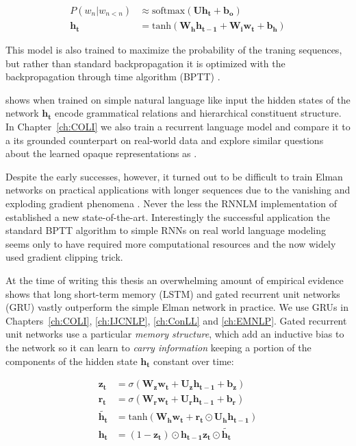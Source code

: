\begin{align}
P(w_n|w_{n<n}) &\approx \text{softmax}(\mathbf{U} \mathbf{h_t} + \mathbf{b_o}) \\
\mathbf{h_t} &= \text{tanh}(\mathbf{W_h}\mathbf{h_{t-1}} + \mathbf{W_i}\mathbf{w_t} + \mathbf{b_h})
\end{align}

This model is also trained to maximize the probability of the traning sequences, but rather than standard
backpropagation it is optimized with the backpropagation through time algorithm (BPTT)
\citep{robinson1987utility,werbos1988generalization,williams1995gradient}.

\cite{elman1991distributed} shows when trained on simple natural language like input the
hidden states of the network $\mathbf{h_t}$ encode grammatical relations and hierarchical
constituent structure. In Chapter~\ref{ch:COLI} we also train a recurrent language model
and compare it to a its grounded counterpart 
on real-world data and explore similar questions about the learned opaque representations 
as \cite{elman1991distributed} .

Despite the early successes, however, it turned out to be difficult to train
Elman networks on practical applications with longer sequences
due to the vanishing and exploding gradient phenomena \citep{bengio1994learning}.
Never the less the RNNLM implementation of \cite{mikolov2010recurrent}
established a new state-of-the-art. Interestingly the successful
application the standard BPTT algorithm
to simple RNNs on real world language modeling \cite{mikolov2012statistical}
seems  only to have required more computational resources and 
the now widely used gradient clipping trick.

At the time of writing this thesis an overwhelming amount of empirical evidence
shows that long short-term memory (LSTM) \citep{hochreiter1997long,gers1999learning}
and gated recurrent unit networks (GRU) \citep{cho2014learning}
vastly outperform the simple Elman network in practice. We use GRUs in
Chapters~\ref{ch:COLI}, \ref{ch:IJCNLP}, \ref{ch:ConLL} and \ref{ch:EMNLP}.
Gated recurrent unit networks use a particular \emph{memory structure}, which
add an inductive bias to the network so it can learn to \emph{carry information}
keeping a portion of the components of the hidden state $\mathbf{h_t}$
constant over time:

\begin{align}
\tag{update-gate}
\mathbf{z_t} &= \sigma(\mathbf{W_z} \mathbf{w_t} + \mathbf{U_z} \mathbf{h_{t-1}} + \mathbf{b_z}) \\
\tag{reset-gate}
\mathbf{r_t} &= \sigma(\mathbf{W_r} \mathbf{w_t} + \mathbf{U_r} \mathbf{h_{t-1}} + \mathbf{b_r})  \\
\tag{memory content}
\mathbf{\tilde{h_t}} &= \text{tanh}(\mathbf{W_h} \mathbf{w_t} + \mathbf{r_t} \odot  \mathbf{U_h} \mathbf{h_{t-1}}) \\
\tag{hidden state}
\mathbf{h_t} &= (1-\mathbf{z_t}) \odot \mathbf{h_{t-1}}  \mathbf{z_t} \odot \mathbf{\tilde{h_t}}
\end{align}

